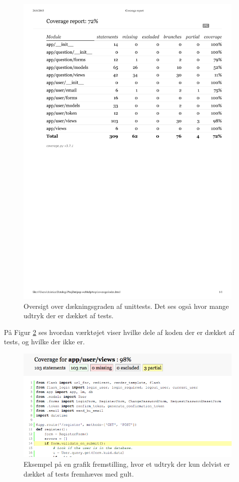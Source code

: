 \documentclass[11pt, a4paper]{article}
\begin{document}
\begin{figure}[h]
    \centering
    \includegraphics[width=1\linewidth]{figures/testcoverage.pdf}
    \caption{Oversigt over dækningsgraden af unittests. Det ses også hvor mange udtryk der er dækket af tests.}
    \label{fig:testcoverage}
\end{figure}

På Figur \ref{fig:code_coverage} ses hvordan værktøjet viser hvilke dele af koden der er dækket af tests, og hvilke der ikke er.

\begin{figure}[h]
    \centering
    \includegraphics[width=1\linewidth]{figures/code_coverage.png}
    \caption{Eksempel på en grafik fremstilling, hvor et udtryk der kun delvist er dækket af tests fremhæves med gult.}
    \label{fig:code_coverage}
\end{figure}
\end{document}
